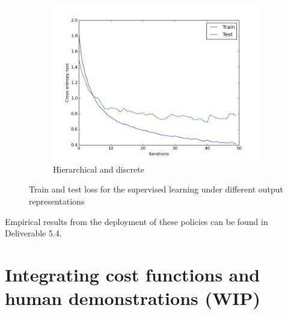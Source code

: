 \documentclass[a4paper,11pt]{report}
\begin{document}
\begin{figure}[t]
    \begin{subfigure}[b]{0.45\columnwidth}
    \includegraphics[clip=true,width=1.\textwidth]{figures/dh_xent.png}
    \caption{Hierarchical and discrete}
    \label{fig:hier_discrete_results}
  \end{subfigure} 

  \caption[SL train test]{Train and test loss for the supervised learning under different output representations}
  \label{fig:SL_results}
\end{figure}

Empirical results from the deployment of these policies can be found in Deliverable 5.4. 

\clearpage


\section{Integrating cost functions and human demonstrations (WIP)} \label{sl+rl}
\end{document}
